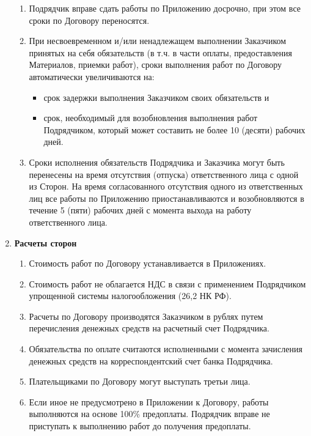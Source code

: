 \documentclass[14pt,a4paper]{article}
\begin{document}
\begin{enumerate}
\begin{enumerate}
		\item Подрядчик вправе сдать работы по Приложению досрочно, при этом все сроки по Договору переносятся.

		\item При несвоевременном и/или ненадлежащем выполнении Заказчиком принятых на себя обязательств (в т.ч. в части оплаты, предоставления Материалов, приемки работ), сроки выполнения работ по Договору автоматически увеличиваются на:
		\begin{itemize}
			\item срок задержки выполнения Заказчиком своих обязательств и
			\item срок, необходимый для возобновления выполнения работ Подрядчиком, который может составить не более 10 (десяти) рабочих дней.
		\end{itemize}

		\item Сроки исполнения обязательств Подрядчика и Заказчика могут быть перенесены на время отсутствия (отпуска) ответственного лица с одной из Сторон. На время согласованного отсутствия одного из ответственных лиц все работы по Приложению приостанавливаются и возобновляются в течение 5 (пяти) рабочих дней с момента выхода на работу ответственного лица.

	\end{enumerate}


	\item
	\begin{center}
	\textbf{Расчеты сторон}
	\end{center}
	\begin{enumerate}
		\item Стоимость работ по Договору устанавливается в Приложениях.

		\item Стоимость работ не облагается НДС в связи с применением Подрядчиком упрощенной системы налогообложения (26,2 НК РФ).

		\item Расчеты по Договору производятся Заказчиком в рублях путем перечисления денежных средств на расчетный счет Подрядчика.

		\item Обязательства по оплате считаются исполненными с момента зачисления денежных средств на корреспондентский счет банка Подрядчика.

		\item Плательщиками по Договору могут выступать третьи лица.

		\item Если иное не предусмотрено в Приложении к Договору, работы выполняются на основе 100\% предоплаты. Подрядчик вправе не приступать к выполнению работ до получения предоплаты.


\end{enumerate}
\end{enumerate}
\end{document}
